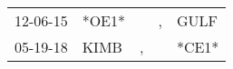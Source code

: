 \begin{supertabular}{lllll}
 12-06-15 &  *OE1* &    &  , &   GULF \\
 05-19-18 &   KIMB &  , &    &  *CE1* \\
\end{supertabular}
